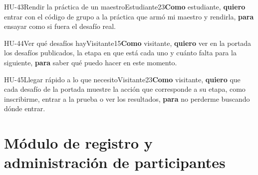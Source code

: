 \begin{historia}[1]{HU-43}{Rendir la práctica de un maestro}{Estudiante}{2}{3}{\textbf{Como} estudiante, \textbf{quiero} entrar con el código de grupo a la práctica que armó mi maestro y rendirla, \textbf{para} ensayar como si fuera el desafío real.}
\end{historia}

\begin{historia}[1]{HU-44}{Ver qué desafíos hay}{Visitante}{1}{5}{\textbf{Como} visitante, \textbf{quiero} ver en la portada los desafíos publicados, la etapa en que está cada uno y cuánto falta para la siguiente, \textbf{para} saber qué puedo hacer en este momento.}
\end{historia}

\begin{historia}[1]{HU-45}{Llegar rápido a lo que necesito}{Visitante}{2}{3}{\textbf{Como} visitante, \textbf{quiero} que cada desafío de la portada muestre la acción que corresponde a su etapa, como inscribirme, entrar a la prueba o ver los resultados, \textbf{para} no perderme buscando dónde entrar.}
\end{historia}

\section*{Módulo de registro y administración de participantes}

